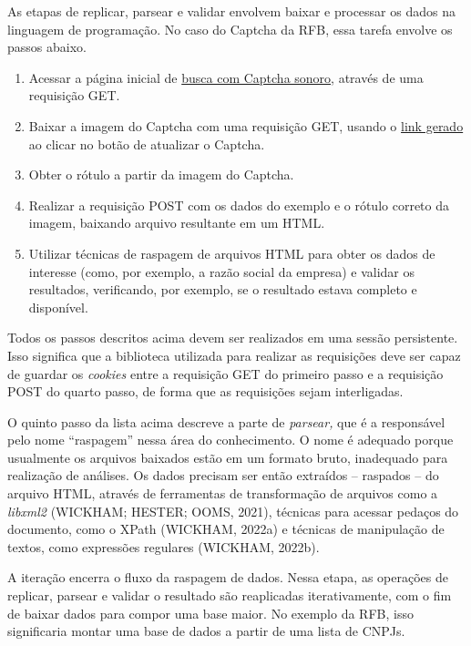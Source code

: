 \documentclass[12pt,twoside,brazilian]{book}
\providecommand{\tightlist}{%
  \setlength{\itemsep}{0pt}\setlength{\parskip}{0pt}}
\begin{document}
As etapas de replicar, parsear e validar envolvem baixar e processar os
dados na linguagem de programação. No caso do Captcha da RFB, essa
tarefa envolve os passos abaixo.

\begin{enumerate}
\def\labelenumi{\arabic{enumi}.}
\tightlist
\item
  Acessar a página inicial de
  \href{http://servicos.receita.fazenda.gov.br/Servicos/cnpjreva/Cnpjreva_Solicitacao_CS.asp}{busca
  com Captcha sonoro}, através de uma requisição GET.
\item
  Baixar a imagem do Captcha com uma requisição GET, usando o
  \href{http://servicos.receita.fazenda.gov.br/Servicos/cnpjreva/captcha/gerarCaptcha.asp}{link
  gerado} ao clicar no botão de atualizar o Captcha.
\item
  Obter o rótulo a partir da imagem do Captcha.
\item
  Realizar a requisição POST com os dados do exemplo e o rótulo correto
  da imagem, baixando arquivo resultante em um HTML.
\item
  Utilizar técnicas de raspagem de arquivos HTML para obter os dados de
  interesse (como, por exemplo, a razão social da empresa) e validar os
  resultados, verificando, por exemplo, se o resultado estava completo e
  disponível.
\end{enumerate}

Todos os passos descritos acima devem ser realizados em uma sessão
persistente. Isso significa que a biblioteca utilizada para realizar as
requisições deve ser capaz de guardar os \emph{cookies} entre a
requisição GET do primeiro passo e a requisição POST do quarto passo, de
forma que as requisições sejam interligadas.

O quinto passo da lista acima descreve a parte de \emph{parsear,} que é
a responsável pelo nome ``raspagem'' nessa área do conhecimento. O nome
é adequado porque usualmente os arquivos baixados estão em um formato
bruto, inadequado para realização de análises. Os dados precisam ser
então extraídos -- raspados -- do arquivo HTML, através de ferramentas
de transformação de arquivos como a \emph{libxml2} (WICKHAM; HESTER;
OOMS, 2021), técnicas para acessar pedaços do documento, como o XPath
(WICKHAM, 2022a) e técnicas de manipulação de textos, como expressões
regulares (WICKHAM, 2022b).

A iteração encerra o fluxo da raspagem de dados. Nessa etapa, as
operações de replicar, parsear e validar o resultado são reaplicadas
iterativamente, com o fim de baixar dados para compor uma base maior. No
exemplo da RFB, isso significaria montar uma base de dados a partir de
uma lista de CNPJs.
\end{document}
